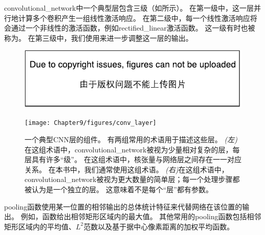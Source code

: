 \gls{convolutional_network}中一个典型层包含三级（如所示）。
在第一级中，这一层并行地计算多个卷积产生一组线性激活响应。
在第二级中，每一个线性激活响应将会通过一个非线性的激活函数，例如\gls{rectified_linear}激活函数。
这一级有时也被称为。
在第三级中，我们使用来进一步调整这一层的输出。
\begin{figure}[!htb]
\ifOpenSource
\centerline{\includegraphics{figure.pdf}}
\else
\centerline{\texttt{[image: Chapter9/figures/conv\_layer]}}
\fi
\caption{一个典型\gls{CNN}层的组件。
有两组常用的术语用于描述这些层。
\emph{(左)}在这组术语中，\gls{convolutional_network}被视为少量相对复杂的层，每层具有许多``级''。
在这组术语中，核张量与网络层之间存在一一对应关系。
在本书中，我们通常使用这组术语。
\emph{(右)}在这组术语中，\gls{convolutional_network}被视为更大数量的简单层；每一个处理步骤都被认为是一个独立的层。
这意味着不是每个``层''都有参数。}
\label{fig:chap9_conv_layer}
\end{figure}

\gls{pooling}函数使用某一位置的相邻输出的总体统计特征来代替网络在该位置的输出。
例如，函数\citep{zhou1988computation}给出相邻矩形区域内的最大值。
其他常用的\gls{pooling}函数包括相邻矩形区域内的平均值、$L^2$范数以及基于据中心像素距离的加权平均函数。

 
